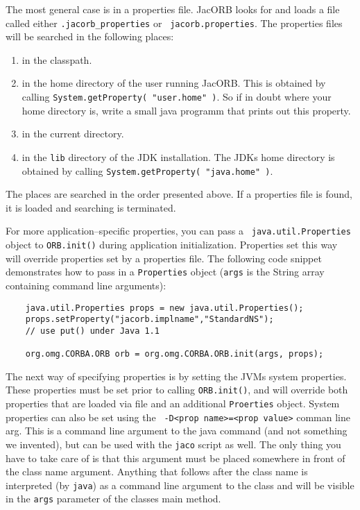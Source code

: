 \documentclass[12pt]{scrbook}
\begin{document}
The most  general case is in  a properties file. JacORB  looks for and
loads  a   file  called  either  {\tt   .jacorb\_properties}  or  {\tt
jacorb.properties}. The properties files will be searched in the
following places:
\begin{enumerate}
  \item in the classpath.
  \item in the home directory of the user running JacORB. This is
        obtained by calling {\tt System.getProperty( "user.home" )}.
        So if in doubt where your home directory is, write a small
        java programm that prints out this property.
  \item in the current directory.
  \item in the {\tt lib} directory of the JDK installation. The JDKs
        home directory is obtained by calling
        {\tt System.getProperty( "java.home" )}.
\end{enumerate}

The places are searched in the order presented above. If a properties
file is found, it is loaded and searching is terminated.

For  more  application--specific  properties,  you  can  pass  a  {\tt
  java.util.Properties} object to  {\tt ORB.init()} during application
  initialization. Properties set this way will override properties set
  by a properties file. The following code snippet demonstrates how to
  pass in  a {\tt Properties} object  ({\tt args} is  the String array
  containing command line arguments):

\small{
\begin{verbatim}
    java.util.Properties props = new java.util.Properties();
    props.setProperty("jacorb.implname","StandardNS");
    // use put() under Java 1.1

    org.omg.CORBA.ORB orb = org.omg.CORBA.ORB.init(args, props);
\end{verbatim}
}

The next way of specifying properties is by setting the JVMs system
properties.  These properties must be set prior to calling {\tt ORB.init()},
and will override both properties that are loaded via file and an additional
{\tt Proerties} object.  System properties can also be set using the {\tt
  -D<prop name>=<prop value>} comman line arg. This is a command line argument
to the java command (and not something we invented), but can be used with the
{\tt jaco} script as well. The only thing you have to take care of is that
this argument must be placed somewhere in front of the class name argument.
Anything that follows after the class name is interpreted (by {\tt java}) as a
command line argument to the class and will be visible in the {\tt args}
parameter of the classes main method.
\end{document}
